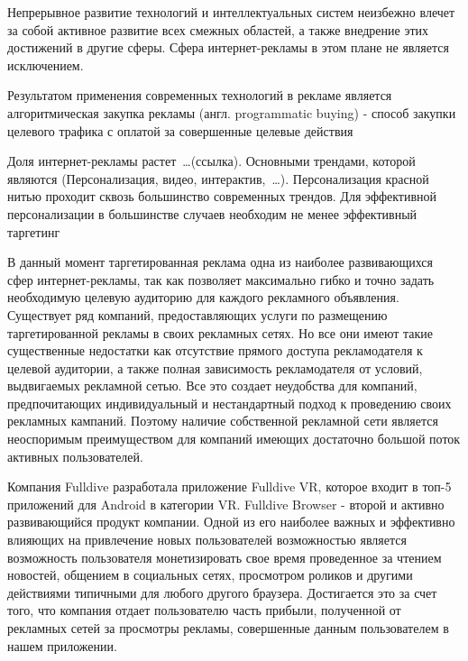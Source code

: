 \documentclass[times]{itmo-student-thesis}
\begin{document}
\tableofcontents









\startprefacepage

Непрерывное развитие технологий и интеллектуальных систем неизбежно влечет за собой активное развитие всех смежных областей, а также внедрение этих достижений в другие сферы. 
Сфера интернет-рекламы в этом плане не является исключением. 

Результатом применения современных технологий в рекламе является алгоритмическая закупка рекламы (англ. programmatic buying) \cite{programmatic-buying} - способ закупки целевого трафика с оплатой за совершенные целевые действия

Доля интернет-рекламы растет …(ссылка). Основными трендами, которой являются (Персонализация, видео, интерактив, …). Персонализация красной нитью проходит сквозь большинство современных трендов. Для эффективной персонализации в большинстве случаев необходим не менее эффективный таргетинг

В данный момент таргетированная реклама одна из наиболее развивающихся сфер интернет-рекламы, так как позволяет максимально гибко и точно задать необходимую целевую аудиторию для каждого рекламного объявления. Существует ряд компаний, предоставляющих услуги по размещению таргетированной рекламы в своих рекламных сетях. Но все они имеют такие существенные недостатки как отсутствие прямого доступа рекламодателя к целевой аудитории, а также полная зависимость рекламодателя от условий, выдвигаемых рекламной сетью. Все это создает неудобства для компаний, предпочитающих индивидуальный и нестандартный подход к проведению своих рекламных кампаний. Поэтому наличие собственной рекламной сети является неоспоримым преимуществом для компаний имеющих достаточно большой поток активных пользователей.

Компания Fulldive разработала приложение Fulldive VR, которое входит в топ-5 приложений для Android в категории VR. Fulldive Browser - второй и активно развивающийся продукт компании. Одной из его наиболее важных и эффективно влияющих на привлечение новых пользователей возможностью является возможность пользователя монетизировать свое время проведенное за чтением новостей, общением в социальных сетях, просмотром роликов и другими действиями типичными для любого другого браузера. Достигается это за счет того, что компания отдает пользователю часть прибыли, полученной от рекламных сетей за просмотры рекламы, совершенные данным пользователем в нашем приложении. 
\end{document}
